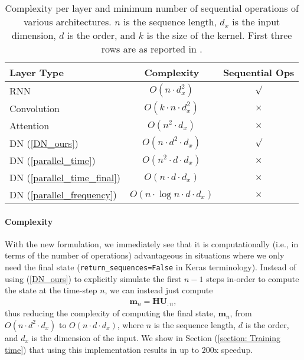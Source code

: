 \documentclass{article}
\def\vm{{\bm{m}}}
\def\mH{{\bm{H}}}
\def\mU{{\bm{U}}}
\begin{document}
\begin{table}
\caption{Complexity per layer and minimum number of sequential operations of various architectures. $n$ is the sequence length, $d_x$ is the input dimension, $d$ is the order, and $k$ is the size of the kernel. First three rows are as reported in \citet{vaswani2017attention}.}
\label{table:complexity}
\begin{center}
\begin{tabular}{lcc}
\hline\noalign{\smallskip}
Layer Type & Complexity & Sequential Ops \\
\hline\noalign{\smallskip}
RNN & $O(n \cdot d^2_x)$ & $\surd$ \\
Convolution & $O(k \cdot n \cdot d_x^2)$ & $\times$  \\
Attention & $O(n^2 \cdot d_x)$ & $\times$ \\
\hline\noalign{\smallskip}
DN (\ref{DN_ours}) &  $O(n \cdot d^2 \cdot d_x)$ & $\surd$\\
DN (\ref{parallel_time}) &  $O(n^2 \cdot d \cdot d_x)$ & $\times$\\
DN (\ref{parallel_time_final}) &  $O(n \cdot d \cdot d_x)$ & $\times$\\
DN (\ref{parallel_frequency}) &  $O(n \cdot \log{n} \cdot d \cdot d_x)$  & $\times$ \\
\hline
\end{tabular}
\end{center}
\end{table}

\paragraph{Complexity} With the new formulation, we immediately see that it is computationally (i.e., in terms of the number of operations) advantageous in situations where we only need the final state (\verb|return_sequences=False| in Keras terminology). Instead of using (\ref{DN_ours}) to explicitly simulate the first $n-1$ steps in-order to compute the state at the time-step $n$, we can instead just compute \begin{align}\label{parallel_time_final}
    \vm_n = \mH \mU_{:n},
\end{align}
thus reducing the complexity of computing the final state, $\vm_n$, from $O(n \cdot d^2 \cdot d_x)$ to $O(n \cdot d \cdot d_x)$, where $n$ is the sequence length, $d$ is the order, and $d_x$ is the dimension of the input.  We show in Section (\ref{section: Training time}) that using this implementation results in up to 200x speedup.
\end{document}
